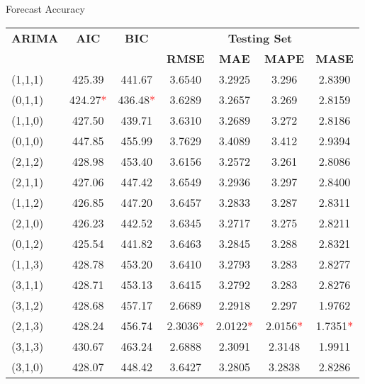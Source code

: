 \documentclass[11pt]{beamer}
\begin{document}
\begin{frame}{Forecast Accuracy}
\begin{table}[h!]
					\begin{tabular}{l c c c c c c}
						\hline
						\rowcolor{navyblue}
						\color{white}\textbf{ARIMA} & 
						\color{white}\textbf{AIC} & 
						\color{white}\textbf{BIC} & 
						\multicolumn{4}{c}{\color{white}\textbf{Testing Set}} \\ 
						\cline{4-7}
						\rowcolor{navyblue}
						\color{white} & \color{white} & \color{white} & 
						\color{white}\textbf{RMSE} & 
						\color{white}\textbf{MAE} & 
						\color{white}\textbf{MAPE} & 
						\color{white}\textbf{MASE} \\
						\hline
						(1,1,1) & 425.39 & 441.67 & 3.6540 & 3.2925 & 3.296 & 2.8390 \\
						(0,1,1) & 424.27\textcolor{red}{*} & 436.48\textcolor{red}{*} & 3.6289 & 3.2657 & 3.269 & 2.8159 \\
						(1,1,0) & 427.50 & 439.71 & 3.6310 & 3.2689 & 3.272 & 2.8186 \\
						(0,1,0) & 447.85 & 455.99 & 3.7629 & 3.4089 & 3.412 & 2.9394 \\
						(2,1,2) & 428.98 & 453.40 & 3.6156 & 3.2572 & 3.261 & 2.8086 \\
						(2,1,1) & 427.06 & 447.42 & 3.6549 & 3.2936 & 3.297 & 2.8400 \\
						(1,1,2) & 426.85 & 447.20 & 3.6457 & 3.2833 & 3.287 & 2.8311 \\
						(2,1,0) & 426.23 & 442.52 & 3.6345 & 3.2717 & 3.275 & 2.8211 \\
						(0,1,2) & 425.54 & 441.82 & 3.6463 & 3.2845 & 3.288 & 2.8321 \\
						(1,1,3) & 428.78 & 453.20 & 3.6410 & 3.2793 & 3.283 & 2.8277 \\
						(3,1,1) & 428.71 & 453.13 & 3.6415 & 3.2792 & 3.283 & 2.8276 \\
						(3,1,2) & 428.68 & 457.17 & 2.6689 & 2.2918 & 2.297 & 1.9762 \\
						(2,1,3) & 428.24 & 456.74 & 2.3036\textcolor{red}{*} & 2.0122\textcolor{red}{*} & 2.0156\textcolor{red}{*} & 1.7351\textcolor{red}{*} \\
						(3,1,3) & 430.67 & 463.24 & 2.6888 & 2.3091 & 2.3148 & 1.9911 \\
						(3,1,0) & 428.07 & 448.42 & 3.6427 & 3.2805 & 3.2838 & 2.8286 \\
						\hline
					\end{tabular}
					
				\end{table}
		
		
	\end{frame}
	
\end{document}
